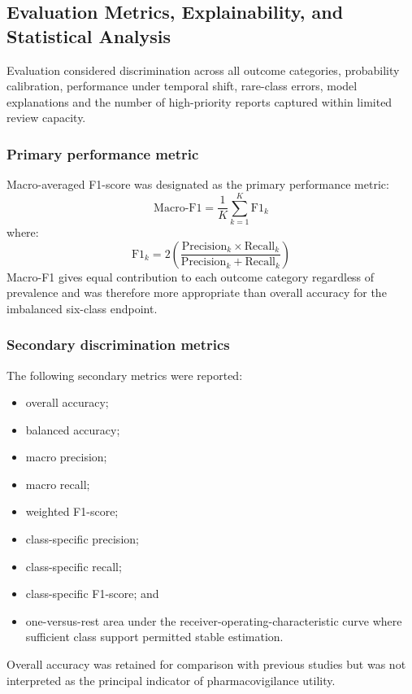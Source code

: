 \documentclass[10pt]{article}
\begin{document}
\subsection{Evaluation Metrics, Explainability, and Statistical Analysis}
Evaluation considered discrimination across all outcome categories, probability calibration, performance under temporal shift, rare-class errors, model explanations and the number of high-priority reports captured within limited review capacity.

\subsubsection{Primary performance metric}
Macro-averaged F1-score was designated as the primary performance metric:
\begin{equation}
\text{Macro-F1} = \frac{1}{K} \sum_{k=1}^{K} \text{F1}_k
\end{equation}
where:
\begin{equation}
\text{F1}_k = 2 \left( \frac{\text{Precision}_k \times \text{Recall}_k}{\text{Precision}_k + \text{Recall}_k} \right)
\end{equation}
Macro-F1 gives equal contribution to each outcome category regardless of prevalence and was therefore more appropriate than overall accuracy for the imbalanced six-class endpoint.

\subsubsection{Secondary discrimination metrics}
The following secondary metrics were reported:
\begin{itemize}
\item overall accuracy;
\item balanced accuracy;
\item macro precision;
\item macro recall;
\item weighted F1-score;
\item class-specific precision;
\item class-specific recall;
\item class-specific F1-score; and
\item one-versus-rest area under the receiver-operating-characteristic curve where sufficient class support permitted stable estimation.
\end{itemize}
Overall accuracy was retained for comparison with previous studies but was not interpreted as the principal indicator of pharmacovigilance utility.
\end{document}
